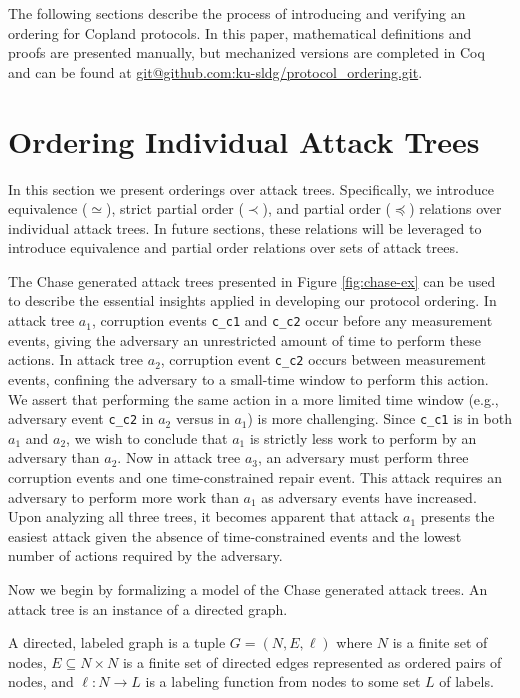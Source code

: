 \documentclass[runningheads]{llncs}
\theoremstyle{definition}
\begin{document}
The following sections describe the process of introducing and
verifying an ordering for Copland protocols. In this paper,
mathematical definitions and proofs are presented manually, but
mechanized versions are completed in Coq and can be found at
\url{git@github.com:ku-sldg/protocol_ordering.git}. 


\section{Ordering Individual Attack Trees}

In this section we present orderings over attack trees. Specifically, we
introduce equivalence ($\simeq$), strict partial order ($\prec$), and
partial order ($\preceq$) relations over individual attack trees. In
future sections, these relations will be leveraged to introduce
equivalence and partial order relations over sets of attack trees.

The Chase generated attack trees presented in Figure
\ref{fig:chase-ex} can be used to describe the essential insights
applied in developing our protocol ordering. In attack tree $a_1$,
corruption events \texttt{c\_c1} and \texttt{c\_c2} occur before any
measurement events, giving the adversary an unrestricted amount
of time to perform these actions. In attack tree $a_2$, corruption
event \texttt{c\_c2} occurs between measurement events, confining the
adversary to a small-time window to perform this action. We assert
that performing the same action in a more limited time window (e.g.,
adversary event \texttt{c\_c2} in $a_2$ versus in $a_1$) is more
challenging. Since \texttt{c\_c1} is in both $a_1$ and $a_2$, we wish to conclude that $a_1$ is
strictly less work to perform by an adversary than $a_2$. Now in
attack tree $a_3$, an adversary must perform three corruption events
and one time-constrained repair event. This attack requires an
adversary to perform more work than $a_1$ as adversary events have
increased. Upon analyzing all three trees, it becomes apparent that
attack $a_1$ presents the easiest attack given the absence of
time-constrained events and the lowest number of actions required by
the adversary.  

Now we begin by formalizing a model of the Chase
generated attack trees. An attack tree is an instance of a directed graph.

\begin{definition}[Graph]
    A directed, labeled graph is a tuple $G = (N, E, \ell)$ where $N$ is a finite set of nodes, $E \subseteq N \times N$ is a finite set of directed edges represented as ordered pairs of nodes, and $\ell : N \rightarrow L$ is a labeling function from nodes to some set $L$ of labels. 
\end{definition} 
 
\end{document}
